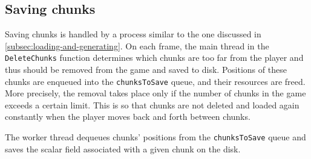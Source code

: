 \subsection{Saving chunks}
Saving chunks is handled by a process similar to the one discussed in \autoref{subsec:loading-and-generating}.
On each frame, the main thread in the \texttt{DeleteChunks} function determines which chunks are too far from the player and thus should be removed from the game and saved to disk.
Positions of these chunks are enqueued into the \texttt{chunksToSave} queue, and their resources are freed.
More precisely, the removal takes place only if the number of chunks in the game exceeds a certain limit.
This is so that chunks are not deleted and loaded again constantly when the player moves back and forth between chunks.

The worker thread dequeues chunks' positions from the \texttt{chunksToSave} queue and saves the scalar field associated with a given chunk on the disk.